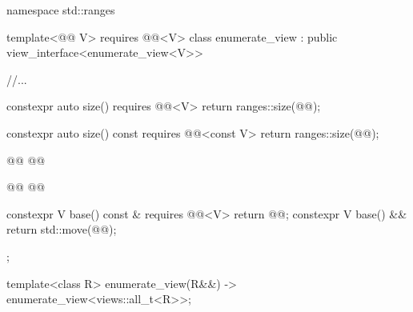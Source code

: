 \documentclass{wg21}
\begin{document}
%
%
%
\begin{codeblock}
namespace std::ranges {
template<@@ V>
requires @@<V>
class enumerate_view : public view_interface<enumerate_view<V>> {
     //...

    constexpr auto size()
    requires @@<V>
    { return ranges::size(@@); }

    constexpr auto size() const
    requires @@<const V>
    { return ranges::size(@@); }

    @@
    @@

    @@
    @@

    constexpr V base() const & requires @@<V> { return @@; }
    constexpr V base() && { return std::move(@@); }
};

template<class R>
enumerate_view(R&&) -> enumerate_view<views::all_t<R>>;
}
\end{codeblock}

%
%
%
%
\end{document}
